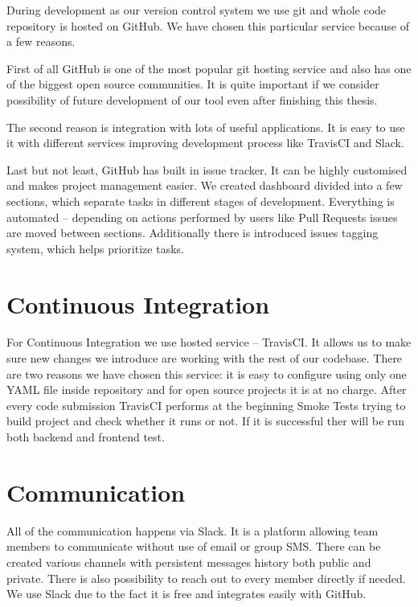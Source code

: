\documentclass[licencjacka,en]{thesisclass}
\begin{document}
    During development as our version control system we use git and whole code repository is hosted on GitHub. We have chosen this particular service because of a few reasons.

    First of all GitHub is one of the most popular git hosting service and also has one of the biggest open source communities. It is quite important if we consider possibility of future development of our tool even after finishing this thesis.

    The second reason is integration with lots of useful applications. It is easy to use it with different services improving development process like TravisCI and Slack.

    Last but not least, GitHub has built in issue tracker. It can be highly customised and makes project management easier. We created dashboard divided into a few sections, which separate tasks in different stages of development. Everything is automated -- depending on actions performed by users like Pull Requests issues are moved between sections. Additionally there is introduced issues tagging system, which helps prioritize tasks.

    \section{Continuous Integration}

    For Continuous Integration we use hosted service -- TravisCI. It allows us to make sure new changes we introduce are working with the rest of our codebase. There are two reasons we have chosen this service: it is easy to configure using only one YAML file inside repository and for open source projects it is at no charge. After every code submission TravisCI performs at the beginning Smoke Tests trying to build project and check whether it runs or not. If it is successful ther will be run both backend and frontend test.

    \section{Communication}

    All of the communication happens via Slack. It is a platform allowing team members to communicate without use of email or group SMS. There can be created various channels with persistent messages history both public and private. There is also possibility to reach out to every member directly if needed. We use Slack due to the fact it is free and integrates easily with GitHub.
\end{document}
